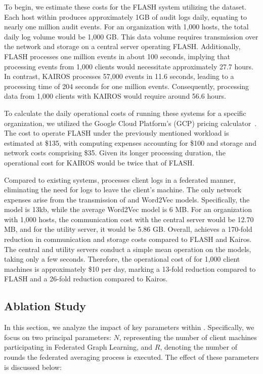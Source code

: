To begin, we estimate these costs for the FLASH system utilizing the \optc dataset. Each host within \optc produces approximately 1GB of audit logs daily, equating to nearly one million audit events. For an organization with 1,000 hosts, the total daily log volume would be 1,000 GB. This data volume requires transmission over the network and storage on a central server operating FLASH. Additionally, FLASH processes one million events in about 100 seconds, implying that processing events from 1,000 clients would necessitate approximately 27.7 hours. In contrast, KAIROS processes 57,000 events in 11.6 seconds, leading to a processing time of 204 seconds for one million events. Consequently, processing data from 1,000 clients with KAIROS would require around 56.6 hours.

To calculate the daily operational costs of running these systems for a specific organization, we utilized the Google Cloud Platform's (GCP) pricing calculator~\cite{gcp}. The cost to operate FLASH under the previously mentioned workload is estimated at \$135, with computing expenses accounting for \$100 and storage and network costs comprising \$35. Given its longer processing duration, the operational cost for KAIROS would be twice that of FLASH.

Compared to existing systems, \Sys processes client logs in a federated manner, eliminating the need for logs to leave the client's machine. The only network expenses arise from the transmission of \gnnshort and Word2Vec models. Specifically, the \gnnshort model is 13kb, while the average Word2Vec model is 6 MB. For an organization with 1,000 hosts, the communication cost with the central server would be 12.70 MB, and for the utility server, it would be 5.86 GB. Overall, \Sys achieves a 170-fold reduction in communication and storage costs compared to FLASH and Kairos. The central and utility servers conduct a simple mean operation on the models, taking only a few seconds. Therefore, the operational cost of \Sys for 1,000 client machines is approximately \$10 per day, marking a 13-fold reduction compared to FLASH and a 26-fold reduction compared to Kairos.

 \subsection{Ablation Study}

 In this section, we analyze the impact of key parameters within \Sys. Specifically, we focus on two principal parameters: $N$, representing the number of client machines participating in Federated Graph Learning, and $R$, denoting the number of rounds the federated averaging process is executed. The effect of these parameters is discussed below: \\

